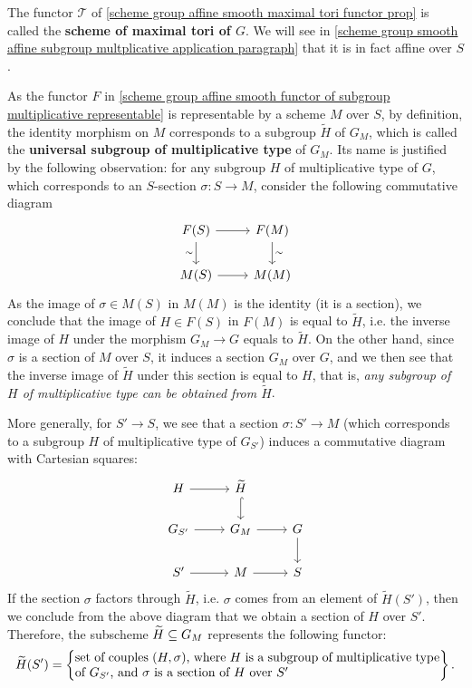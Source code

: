 The functor $\mathscr{T}$ of \cref{scheme group affine smooth maximal tori functor prop} is called the \textbf{scheme of maximal tori of $G$}. We will see in \ref{scheme group smooth affine subgroup multplicative application paragraph} that it is in fact affine over $S$.

\begin{remark}\label{scheme group affine smooth universal subgroup multiplicative}
As the functor $F$ in \cref{scheme group affine smooth functor of subgroup multiplicative representable} is representable by a scheme $M$ over $S$, by definition, the identity morphism on $M$ corresponds to a subgroup $\widetilde{H}$ of $G_M$, which is called the \textbf{universal subgroup of multiplicative type} of $G_M$. Its name is justified by the following observation: for any subgroup $H$ of multiplicative type of $G$, which corresponds to an $S$-section $\sigma:S\to M$, consider the following commutative diagram
\[\begin{tikzcd}
F(S)\ar[d,swap,"\sim"]\ar[r]&F(M)\ar[d,"\sim"]\\
M(S)\ar[r]&M(M)
\end{tikzcd}\]
As the image of $\sigma\in M(S)$ in $M(M)$ is the identity (it is a section), we conclude that the image of $H\in F(S)$ in $F(M)$ is equal to $\widetilde{H}$, i.e. the inverse image of $H$ under the morphism $G_M\to G$ equals to $\widetilde{H}$. On the other hand, since $\sigma$ is a section of $M$ over $S$, it induces a section $G_M$ over $G$, and we then see that the inverse image of $\widetilde{H}$ under this section is equal to $H$, that is, \textit{any subgroup of $H$ of multiplicative type can be obtained from $\widetilde{H}$}.\par
More generally, for $S'\to S$, we see that a section $\sigma:S'\to M$ (which corresponds to a subgroup $H$ of multiplicative type of $G_{S'}$) induces a commutative diagram with Cartesian squares:
\[\begin{tikzcd}
H\ar[r]&\widetilde{H}\ar[d,hook]&\\
G_{S'}\ar[r]&G_M\ar[r]&G\ar[d]\\
S'\ar[r]&M\ar[r]&S
\end{tikzcd}\]
If the section $\sigma$ factors through $\widetilde{H}$, i.e. $\sigma$ comes from an element of $\widetilde{H}(S')$, then we conclude from the above diagram that we obtain a section of $H$ over $S'$. Therefore, the subscheme $\widetilde{H}\subseteq G_M$ represents the following functor:
\begin{equation*}
\widetilde{H}(S')=\left\{
    \parbox{4in}{%
    set of couples $(H,\sigma)$, where $H$ is a subgroup of multiplicative type of $G_{S'}$, and $\sigma$ is a section of $H$ over $S'$%
    }
\right\}.
\end{equation*}


\end{remark}
